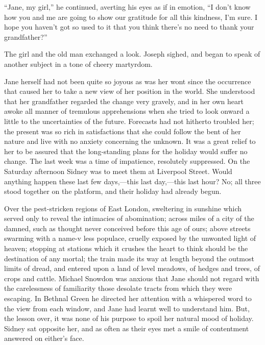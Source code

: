 ``Jane, my girl,'' he continued, averting his eyes as if in emotion, ``I
don't know how you and me are going to show our gratitude for all this
kindness, I'm sure. I hope you haven't got so used to it that you think
there's no need to thank your grandfather?''

The girl and the old man exchanged a
{\protect\hypertarget{108}{}{}}look. Joseph sighed, and began to speak
of another subject in a tone of cheery martyrdom.

Jane herself had not been quite so joyous as was her wont since the
occurrence that caused her to take a new view of her position in the
world. She understood that her grandfather regarded the change very
gravely, and in her own heart awoke all manner of tremulous
apprehensions when she tried to look onward a little to the
uncertainties of the future. Forecasts had not hitherto troubled her;
the present was so rich in satisfactions that she could follow the bent
of her nature and live with no anxiety concerning the unknown. It was a
great relief to her to be assured that the long-standing plans for the
holiday would suffer no change. The last week was a time of impatience,
resolutely suppressed. On the Saturday afternoon Sidney was to meet them
at Liverpool Street. Would anything happen these last few days,---this
last day,---this last hour? No; all three stood together on the
platform, and their holiday had already begun.

{\protect\hypertarget{109}{}{}}Over the pest-stricken regions of East
London, sweltering in sunshine which served only to reveal the
intimacies of abomination; across miles of a city of the damned, such as
thought never conceived before this age of ours; above streets swarming
with a name-v less populace, cruelly exposed by the unwonted light of
heaven; stopping at stations which it crushes the heart to think should
be the destination of any mortal; the train made its way at length
beyond the outmost limits of dread, and entered upon a land of level
meadows, of hedges and trees, of crops and cattle. Michael Snowdon was
anxious that Jane should not regard with the carelessness of familiarity
those desolate tracts from which they were escaping. In Bethnal Green he
directed her attention with a whispered word to the view from each
window, and Jane had learnt well to understand him. But, the lesson
over, it was none of his purpose to spoil her natural mood of holiday.
Sidney sat opposite her, and as often as their eyes met a smile of
contentment answered on either's face.

